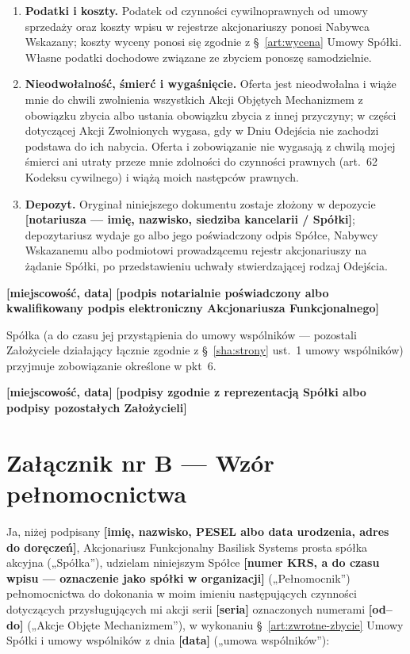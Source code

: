 \documentclass[12pt,a4paper]{report}
\newcommand{\field}[1]{\textbf{[#1]}}
\newcommand{\CompanyFull}{Basilisk Systems prosta spółka akcyjna}
\begin{document}
\begin{enumerate}
  \item \textbf{Podatki i koszty.} Podatek od czynności cywilnoprawnych od umowy sprzedaży oraz koszty wpisu w rejestrze akcjonariuszy ponosi Nabywca Wskazany; koszty wyceny ponosi się zgodnie z §~\ref{art:wycena} Umowy Spółki. Własne podatki dochodowe związane ze zbyciem ponoszę samodzielnie.
  \item \textbf{Nieodwołalność, śmierć i wygaśnięcie.} Oferta jest nieodwołalna i wiąże mnie do chwili zwolnienia wszystkich Akcji Objętych Mechanizmem z obowiązku zbycia albo ustania obowiązku zbycia z innej przyczyny; w części dotyczącej Akcji Zwolnionych wygasa, gdy w Dniu Odejścia nie zachodzi podstawa do ich nabycia. Oferta i zobowiązanie nie wygasają z chwilą mojej śmierci ani utraty przeze mnie zdolności do czynności prawnych (art.~62 Kodeksu cywilnego) i wiążą moich następców prawnych.
  \item \textbf{Depozyt.} Oryginał niniejszego dokumentu zostaje złożony w depozycie \field{notariusza --- imię, nazwisko, siedziba kancelarii / Spółki}; depozytariusz wydaje go albo jego poświadczony odpis Spółce, Nabywcy Wskazanemu albo podmiotowi prowadzącemu rejestr akcjonariuszy na żądanie Spółki, po przedstawieniu uchwały stwierdzającej rodzaj Odejścia.
\end{enumerate}

\field{miejscowość, data} \hfill \field{podpis notarialnie poświadczony albo kwalifikowany podpis elektroniczny Akcjonariusza Funkcjonalnego}

\medskip
Spółka (a do czasu jej przystąpienia do umowy wspólników --- pozostali Założyciele działający łącznie zgodnie z §~\ref{sha:strony} ust.~1 umowy wspólników) przyjmuje zobowiązanie określone w pkt~6.

\field{miejscowość, data} \hfill \field{podpisy zgodnie z reprezentacją Spółki albo podpisy pozostałych Założycieli}

\newpage
\section*{Załącznik nr B — Wzór pełnomocnictwa}

Ja, niżej podpisany \field{imię, nazwisko, PESEL albo data urodzenia, adres do doręczeń}, Akcjonariusz Funkcjonalny \CompanyFull{} („Spółka”), udzielam niniejszym Spółce \field{numer KRS, a do czasu wpisu --- oznaczenie jako spółki w organizacji} („Pełnomocnik”) pełnomocnictwa do dokonania w moim imieniu następujących czynności dotyczących przysługujących mi akcji serii \field{seria} oznaczonych numerami \field{od--do} („Akcje Objęte Mechanizmem”), w wykonaniu §~\ref{art:zwrotne-zbycie} Umowy Spółki i umowy wspólników z dnia \field{data} („umowa wspólników”):
\end{document}
